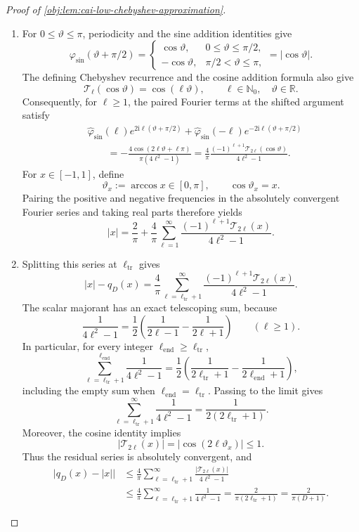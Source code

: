 \documentclass[11pt]{article}
\begin{document}
\begin{proof}[Proof of \cref{obj:lem:cai-low-chebyshev-approximation}]
\begin{enumerate}
\item For \(0\le\vartheta\le\pi\), periodicity and the sine addition identities give
\[
\varphi_{\sin}(\vartheta+\pi/2)
=
\begin{cases}
\cos\vartheta,&0\le\vartheta\le\pi/2,\\
-\cos\vartheta,&\pi/2<\vartheta\le\pi,
\end{cases}
=|\cos\vartheta|.
\]
The defining Chebyshev recurrence and the cosine addition formula also give
\[
\mathcal T_\ell(\cos\vartheta)=\cos(\ell\vartheta),
\qquad \ell\in\mathbb N_0,\quad \vartheta\in\mathbb R.
\]
Consequently, for \(\ell\ge1\), the paired Fourier terms at the shifted argument satisfy
\[
\begin{aligned}
&\widehat\varphi_{\sin}(\ell)
 e^{2\mathrm i\ell(\vartheta+\pi/2)}
+\widehat\varphi_{\sin}(-\ell)
 e^{-2\mathrm i\ell(\vartheta+\pi/2)}
\\
&\qquad
=-\frac{4\cos(2\ell\vartheta+\ell\pi)}
 {\pi(4\ell^2-1)}
=\frac4\pi
 \frac{(-1)^{\ell+1}\mathcal T_{2\ell}(\cos\vartheta)}
 {4\ell^2-1}.
\end{aligned}
\]
For \(x\in[-1,1]\), define
\[
\vartheta_x:=\arccos x\in[0,\pi],
\qquad \cos\vartheta_x=x.
\]
Pairing the positive and negative frequencies in the absolutely convergent Fourier series and taking real parts therefore yields
\[
|x|=\frac2\pi+\frac4\pi\sum_{\ell=1}^{\infty}
 \frac{(-1)^{\ell+1}\mathcal T_{2\ell}(x)}
 {4\ell^2-1}.
\]

\item Splitting this series at \(\ell_{\mathrm{tr}}\) gives
\[
|x|-q_D(x)
=\frac4\pi\sum_{\ell=\ell_{\mathrm{tr}}+1}^{\infty}
 \frac{(-1)^{\ell+1}\mathcal T_{2\ell}(x)}
 {4\ell^2-1}.
\]
The scalar majorant has an exact telescoping sum, because
\[
\frac1{4\ell^2-1}
=\frac12\left(\frac1{2\ell-1}-\frac1{2\ell+1}\right)
\qquad(\ell\ge1).
\]
In particular, for every integer \(\ell_{\mathrm{end}}\ge\ell_{\mathrm{tr}}\),
\[
\sum_{\ell=\ell_{\mathrm{tr}}+1}^{\ell_{\mathrm{end}}}
 \frac1{4\ell^2-1}
=\frac12\left(
 \frac1{2\ell_{\mathrm{tr}}+1}
 -\frac1{2\ell_{\mathrm{end}}+1}\right),
\]
including the empty sum when \(\ell_{\mathrm{end}}=\ell_{\mathrm{tr}}\). Passing to the limit gives
\[
\sum_{\ell=\ell_{\mathrm{tr}}+1}^{\infty}
 \frac1{4\ell^2-1}
=\frac1{2(2\ell_{\mathrm{tr}}+1)}.
\]
Moreover, the cosine identity implies
\[
|\mathcal T_{2\ell}(x)|
=|\cos(2\ell\vartheta_x)|\le1.
\]
Thus the residual series is absolutely convergent, and
\[
\begin{aligned}
\bigl|q_D(x)-|x|\bigr|
&\le\frac4\pi
 \sum_{\ell=\ell_{\mathrm{tr}}+1}^{\infty}
 \frac{|\mathcal T_{2\ell}(x)|}{4\ell^2-1}\\
&\le\frac4\pi
 \sum_{\ell=\ell_{\mathrm{tr}}+1}^{\infty}
 \frac1{4\ell^2-1}
=\frac2{\pi(2\ell_{\mathrm{tr}}+1)}
=\frac2{\pi(D+1)}.
\end{aligned}
\]


\end{enumerate}
\end{proof}
\end{document}
